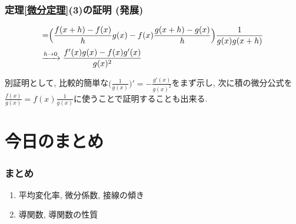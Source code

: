 

\begin{frame}
\frametitle{定理\ref{微分定理}(3)の証明 (発展)}


\begin{align*}
=& 
\Big(
\frac{f(x+h)-f(x)}{h} g(x)- f(x)\frac{g(x+h)-g(x)}{h}
\Big) \frac{1}{g(x)g(x+h)}
\\
& \hspace{-4mm} \xrightarrow{h \to 0} 
\frac{f'(x)g(x)-f(x)g'(x)}{g(x)^2}
\end{align*}

別証明として, 比較的簡単な$\Big(\frac{1}{g(x)}\Big)'=-\frac{g'(x)}{g(x)^2}$をまず示し, 
次に積の微分公式を$\frac{f(x)}{g(x)}=f(x) \frac{1}{g(x)}$に使うことで証明することも出来る. 

\end{frame}






\section{今日のまとめ}
\begin{frame}
\frametitle{まとめ}   


\begin{enumerate}
\item 平均変化率, 微分係数, 接線の傾き
\item 導関数, 導関数の性質
\end{enumerate} 


\end{frame}
